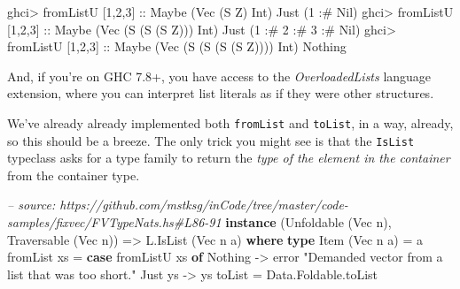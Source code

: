 \documentclass[]{article}
\newenvironment{Shaded}{}{}
\newcommand{\KeywordTok}[1]{\textcolor[rgb]{0.00,0.44,0.13}{\textbf{#1}}}
\newcommand{\DataTypeTok}[1]{\textcolor[rgb]{0.56,0.13,0.00}{#1}}
\newcommand{\DecValTok}[1]{\textcolor[rgb]{0.25,0.63,0.44}{#1}}
\newcommand{\StringTok}[1]{\textcolor[rgb]{0.25,0.44,0.63}{#1}}
\newcommand{\CommentTok}[1]{\textcolor[rgb]{0.38,0.63,0.69}{\textit{#1}}}
\newcommand{\OtherTok}[1]{\textcolor[rgb]{0.00,0.44,0.13}{#1}}
\newcommand{\FunctionTok}[1]{\textcolor[rgb]{0.02,0.16,0.49}{#1}}
\newcommand{\NormalTok}[1]{#1}
\begin{document}
\begin{Shaded}
\begin{Highlighting}[]
\NormalTok{ghci}\FunctionTok{>}\NormalTok{ fromListU [}\DecValTok{1}\NormalTok{,}\DecValTok{2}\NormalTok{,}\DecValTok{3}\NormalTok{]}\OtherTok{ ::} \DataTypeTok{Maybe}\NormalTok{ (}\DataTypeTok{Vec}\NormalTok{ (}\DataTypeTok{S} \DataTypeTok{Z}\NormalTok{) }\DataTypeTok{Int}\NormalTok{)}
\DataTypeTok{Just}\NormalTok{ (}\DecValTok{1} \FunctionTok{:#} \DataTypeTok{Nil}\NormalTok{)}
\NormalTok{ghci}\FunctionTok{>}\NormalTok{ fromListU [}\DecValTok{1}\NormalTok{,}\DecValTok{2}\NormalTok{,}\DecValTok{3}\NormalTok{]}\OtherTok{ ::} \DataTypeTok{Maybe}\NormalTok{ (}\DataTypeTok{Vec}\NormalTok{ (}\DataTypeTok{S}\NormalTok{ (}\DataTypeTok{S}\NormalTok{ (}\DataTypeTok{S} \DataTypeTok{Z}\NormalTok{))) }\DataTypeTok{Int}\NormalTok{)}
\DataTypeTok{Just}\NormalTok{ (}\DecValTok{1} \FunctionTok{:#} \DecValTok{2} \FunctionTok{:#} \DecValTok{3} \FunctionTok{:#} \DataTypeTok{Nil}\NormalTok{)}
\NormalTok{ghci}\FunctionTok{>}\NormalTok{ fromListU [}\DecValTok{1}\NormalTok{,}\DecValTok{2}\NormalTok{,}\DecValTok{3}\NormalTok{]}\OtherTok{ ::} \DataTypeTok{Maybe}\NormalTok{ (}\DataTypeTok{Vec}\NormalTok{ (}\DataTypeTok{S}\NormalTok{ (}\DataTypeTok{S}\NormalTok{ (}\DataTypeTok{S}\NormalTok{ (}\DataTypeTok{S} \DataTypeTok{Z}\NormalTok{)))) }\DataTypeTok{Int}\NormalTok{)}
\DataTypeTok{Nothing}
\end{Highlighting}
\end{Shaded}

And, if you're on GHC 7.8+, you have access to the \emph{OverloadedLists}
language extension, where you can interpret list literals as if they were other
structures.

We've already already implemented both \texttt{fromList} and \texttt{toList}, in
a way, already, so this should be a breeze. The only trick you might see is that
the \texttt{IsList} typeclass asks for a type family to return the \emph{type of
the element in the container} from the container type.

\begin{Shaded}
\begin{Highlighting}[]
\CommentTok{-- source: https://github.com/mstksg/inCode/tree/master/code-samples/fixvec/FVTypeNats.hs#L86-91}
\KeywordTok{instance}\NormalTok{ (}\DataTypeTok{Unfoldable}\NormalTok{ (}\DataTypeTok{Vec}\NormalTok{ n), }\DataTypeTok{Traversable}\NormalTok{ (}\DataTypeTok{Vec}\NormalTok{ n)) }\OtherTok{=>} \DataTypeTok{L.IsList}\NormalTok{ (}\DataTypeTok{Vec}\NormalTok{ n a) }\KeywordTok{where}
    \KeywordTok{type} \DataTypeTok{Item}\NormalTok{ (}\DataTypeTok{Vec}\NormalTok{ n a) }\FunctionTok{=}\NormalTok{ a}
\NormalTok{    fromList xs }\FunctionTok{=} \KeywordTok{case}\NormalTok{ fromListU xs }\KeywordTok{of}
                    \DataTypeTok{Nothing} \OtherTok{->}\NormalTok{ error }\StringTok{"Demanded vector from a list that was too short."}
                    \DataTypeTok{Just}\NormalTok{ ys }\OtherTok{->}\NormalTok{ ys}
\NormalTok{    toList      }\FunctionTok{=}\NormalTok{ Data.Foldable.toList}
\end{Highlighting}
\end{Shaded}
\end{document}
